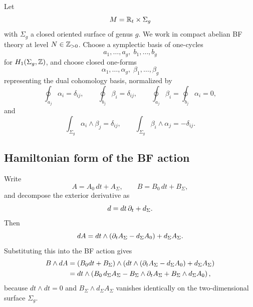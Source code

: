 \begin{assumption}\label{ass:bf-gsd}
Let
\begin{equation*}
M=\mathbb{R}_t\times \Sigma_g
\end{equation*}
with $\Sigma_g$ a closed oriented surface of genus $g$. We work in compact abelian BF theory at level $N\in \mathbb{Z}_{>0}$. Choose a symplectic basis of one-cycles
\begin{equation*}
a_1,\dots,a_g,\; b_1,\dots,b_g
\end{equation*}
for $H_1(\Sigma_g,\mathbb{Z})$, and choose closed one-forms
\begin{equation*}
\alpha_1,\dots,\alpha_g,\; \beta_1,\dots,\beta_g
\end{equation*}
representing the dual cohomology basis, normalized by
\begin{equation}\label{eq:bf-basis-periods}
\oint_{a_j}\alpha_i=\delta_{ij},
\qquad
\oint_{b_j}\beta_i=\delta_{ij},
\qquad
\oint_{a_j}\beta_i=\oint_{b_j}\alpha_i=0,
\end{equation}
and
\begin{equation}\label{eq:bf-basis-pairing}
\int_{\Sigma_g}\alpha_i\wedge \beta_j=\delta_{ij},
\qquad
\int_{\Sigma_g}\beta_i\wedge \alpha_j=-\delta_{ij}.
\end{equation}
\end{assumption}

\subsection{Hamiltonian form of the BF action}

Write
\begin{equation*}
A=A_0\,dt+A_\Sigma,
\qquad
B=B_0\,dt+B_\Sigma,
\end{equation*}
and decompose the exterior derivative as
\begin{equation*}
d=dt\,\partial_t+d_\Sigma.
\end{equation*}
Then
\begin{equation*}
dA=dt\wedge(\partial_t A_\Sigma-d_\Sigma A_0)+d_\Sigma A_\Sigma.
\end{equation*}
Substituting this into the BF action gives
\begin{align}
B\wedge dA
&=
(B_0dt+B_\Sigma)\wedge\left(dt\wedge(\partial_t A_\Sigma-d_\Sigma A_0)+d_\Sigma A_\Sigma\right) \notag\\
&=
dt\wedge\left(B_0\,d_\Sigma A_\Sigma-B_\Sigma\wedge \partial_t A_\Sigma+B_\Sigma\wedge d_\Sigma A_0\right),
\label{eq:bf-split-first}
\end{align}
because $dt\wedge dt=0$ and $B_\Sigma\wedge d_\Sigma A_\Sigma$ vanishes identically on the two-dimensional surface $\Sigma_g$.

